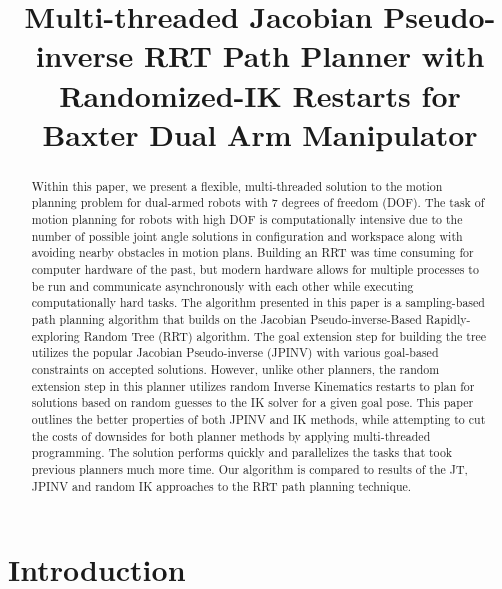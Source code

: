 \documentclass[conference]{IEEEtran} \usepackage[T1]{fontenc} \usepackage[backend=biber, style=ieee]{biblatex}
\begin{document}
\title{Multi-threaded Jacobian Pseudo-inverse RRT Path Planner with Randomized-IK Restarts for Baxter Dual Arm Manipulator}

\author{
}

\maketitle

\begin{abstract}
Within this paper, we present a flexible, multi-threaded solution to the motion planning problem for dual-armed robots with 7 degrees of freedom (DOF). The task of motion 
planning for robots with high DOF is computationally intensive due to the number of possible joint angle solutions in configuration and workspace along with avoiding nearby 
obstacles in motion plans. Building an RRT was time consuming for computer hardware of the past, but modern hardware allows for multiple processes to be run and communicate 
asynchronously with each other while executing computationally hard tasks. The algorithm presented in this paper is a sampling-based path planning algorithm that builds on the 
Jacobian Pseudo-inverse-Based Rapidly-exploring Random Tree (RRT) algorithm. The goal extension step for building the tree utilizes the popular Jacobian Pseudo-inverse (JPINV)
with various goal-based constraints on accepted solutions. However, unlike other planners, the random extension step in this planner utilizes random Inverse Kinematics 
restarts to plan for solutions based on random guesses to the IK solver for a given goal pose. This paper outlines the better properties of both JPINV and IK methods, while 
attempting to cut the costs of downsides for both planner methods by applying multi-threaded programming. The solution performs quickly and parallelizes the tasks that took
previous planners much more time. Our algorithm is compared to results of the JT, JPINV and random IK approaches to the RRT path planning technique.
\end{abstract}

\section{Introduction} \label{Introduction}
\end{document}
